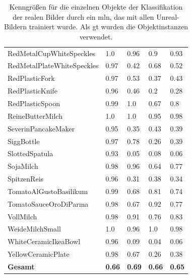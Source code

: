\begin{table}
\begin{tabularx}{\textwidth}{Xllll}
RedMetalCupWhiteSpeckles & 1.0 & 0.96 & 0.9 & 0.93 \\  
RedMetalPlateWhiteSpeckles & 0.97 & 0.42 & 0.68 & 0.52 \\  
RedPlasticFork & 0.97 & 0.53 & 0.37 & 0.43 \\  
RedPlasticKnife & 0.96 & 0.46 & 0.2 & 0.28 \\  
RedPlasticSpoon & 0.99 & 1.0 & 0.67 & 0.8 \\  
ReineButterMilch & 1.0 & 1.0 & 0.95 & 0.98 \\  
SeverinPancakeMaker & 0.95 & 0.35 & 0.43 & 0.39 \\  
SiggBottle & 0.97 & 0.78 & 0.26 & 0.39 \\  
SlottedSpatula & 0.93 & 0.05 & 0.08 & 0.06 \\  
SojaMilch & 0.98 & 0.96 & 0.64 & 0.77 \\  
SpitzenReis & 0.96 & 0.31 & 0.38 & 0.34 \\  
TomatoAlGustoBasilikum & 0.99 & 0.68 & 0.81 & 0.74 \\  
TomatoSauceOroDiParma & 0.98 & 0.67 & 0.92 & 0.77 \\  
VollMilch & 0.98 & 0.91 & 0.76 & 0.83 \\  
WeideMilchSmall & 1.0 & 0.96 & 1.0 & 0.98 \\  
WhiteCeramicIkeaBowl & 0.96 & 0.09 & 0.04 & 0.06 \\  
YellowCeramicPlate & 0.98 & 0.67 & 0.26 & 0.38 \\     \hline
\textbf{Gesamt}		&	\textbf{0.66}   &	\textbf{0.69}  & \textbf{0.66}     &  \textbf{0.65}     \\
\end{tabularx}
\caption[Objektinstanzen-spezifische Kenngrößen der Klassifikation mit Unreal-Trainingsset und realem Testset]{Kenngrößen für die einzelnen Objekte der Klassifikation der realen Bilder durch ein \gls{mln}, das mit allen Unreal-Bildern trainiert wurde. Als \gls{gt} wurden die Objektinstanzen verwendet.}
\label{tab:UnrealRealGTInstance_metrics}
\end{table}


